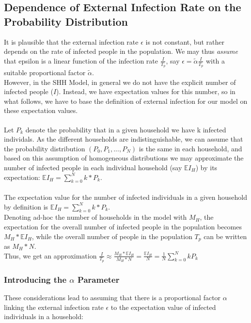 \documentclass[paper=a4, fontsize=11pt, twoside, BCOR=12mm, parskip=full, listof=totoc]{scrreprt}
\begin{document}
\subsection*{Dependence of External Infection Rate on the Probability Distribution}
It is plausible that the external infection rate $\epsilon$ is not constant, but rather depends on the rate of infected people in the population.
We may thus \emph{assume} that epsilon is a linear function of the infection rate $\frac{I}{T_p}$, say $\epsilon=\tilde{\alpha}\frac{I}{T_p}$ with a suitable proportional factor $\tilde{\alpha}$.
\\
However, in the SHH Model, in general we do not have the explicit number of infected people ($I$). Instead, we have expectation values for this number, so in what follows, we have to base the definition of external infection for our model on these expectation values.
\\
\\
Let $P_k$ denote the probability that in a given household we have k infected individals.
As the different households are indistinguishable, we can assume that the probability distribution $(P_0,P_1,...,P_N)$ is the same in each household, 
and based on this assumption of homogeneous distributions we may approximate the number of infected people in each individual household (say $\mathbb{E}I_H$) 
by its expectation: $\mathbb{E}I_H=\sum_{k=0}^N k*P_k$.
\\
\\
The expectation value for the number of infected individuals in a given household by definition is $\mathbb{E}I_H=\sum_{k=0}^Nk*P_k$.
\\
Denoting ad-hoc the number of households in the model with $M_H$, the expectation for the overall number of infected people in the population becomes $M_H*\mathbb{E}I_H$, 
while the overall number of people in the population $T_p$ can be written as $M_H*N$.
\\
Thus, we get an approximation $\frac{I}{T_p} \approx \frac{M_H*\mathbb{E}I_H}{M_H*N}=\frac{\mathbb{E}I_H}{N}=\frac{1}{N}{\sum_{k=0}^N kP_k}$
\\

\subsubsection*{Introducing the $\alpha$ Parameter}
These considerations lead to assuming that there is a proportional factor $\alpha$ linking the external infection rate $\epsilon$ 
to the expectation value of infected individuals in a household:
\end{document}

